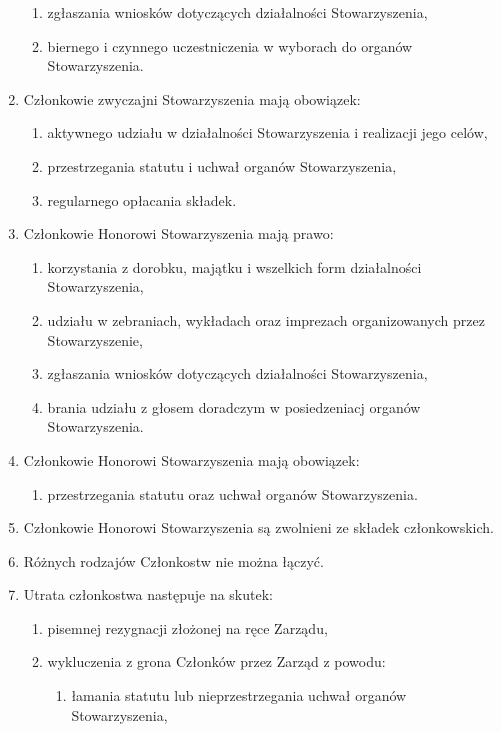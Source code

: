 \documentclass[a4paper,draft,10pt]{article}
\begin{document}
\begin{enumerate}
\begin{enumerate}
        \item zgłaszania wniosków dotyczących działalności Stowarzyszenia,
        \item biernego i czynnego uczestniczenia w wyborach do organów Stowarzyszenia.
      \end{enumerate}
    \item Członkowie zwyczajni Stowarzyszenia mają obowiązek:
      \begin{enumerate}
        \item aktywnego udziału w działalności Stowarzyszenia i realizacji jego celów,
        \item przestrzegania statutu i uchwał organów Stowarzyszenia,
        \item regularnego opłacania składek.
      \end{enumerate}
    \item Członkowie Honorowi Stowarzyszenia mają prawo:
      \begin{enumerate}
        \item korzystania z dorobku, majątku i wszelkich form działalności Stowarzyszenia,
        \item udziału w zebraniach, wykładach oraz imprezach organizowanych przez Stowarzyszenie,
        \item zgłaszania wniosków dotyczących działalności Stowarzyszenia,
        \item brania udziału z głosem doradczym w posiedzeniacj organów Stowarzyszenia.
      \end{enumerate}
    \item Członkowie Honorowi Stowarzyszenia mają obowiązek:
      \begin{enumerate}
        \item przestrzegania statutu oraz uchwał organów Stowarzyszenia.
      \end{enumerate}
    \item Członkowie Honorowi Stowarzyszenia są zwolnieni ze składek członkowskich.
    \item Różnych rodzajów Członkostw nie można łączyć.
    \item Utrata członkostwa następuje na skutek:
      \begin{enumerate}
        \item pisemnej rezygnacji złożonej na ręce Zarządu,
        \item wykluczenia z grona Członków przez Zarząd z powodu:
          \begin{enumerate}
            \item łamania statutu lub nieprzestrzegania uchwał organów Stowarzyszenia,

\end{enumerate}
\end{enumerate}
\end{enumerate}
\end{document}
